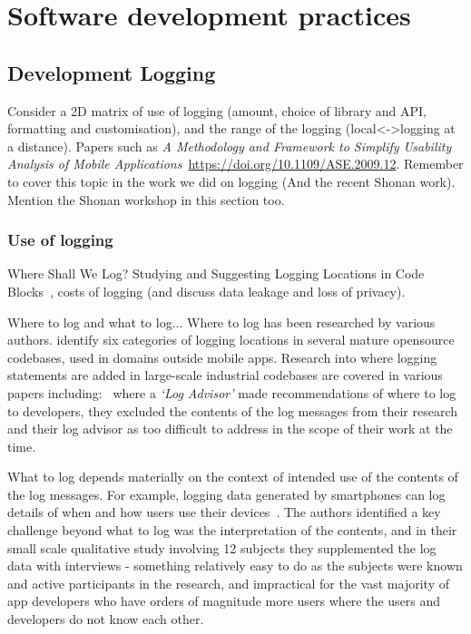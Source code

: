 \section{Software development practices}

\subsection{Development Logging}
Consider a 2D matrix of use of logging (amount, choice of library and API, formatting and customisation), and the range of the logging (local<->logging at a distance). Papers such as \emph{A Methodology and Framework to Simplify Usability Analysis of Mobile Applications}~\url{https://doi.org/10.1109/ASE.2009.12}. Remember to cover this topic in the work we did on logging (And the recent Shonan work). Mention the Shonan workshop in this section too.

\subsubsection{Use of logging}

Where Shall We Log? Studying and Suggesting Logging Locations in Code Blocks~, costs of logging (and discuss data leakage and loss of privacy).


Where to log and what to log... Where to log has been researched by various authors. \cite{li2020_where_shall_we_log} identify six categories of logging locations in several mature opensource codebases, used in domains outside mobile apps. Research into where logging statements are added in large-scale industrial codebases are covered in various papers including:~\cite{zhu2015_learning_to_log} where a \emph{`Log Advisor'} made recommendations of where to log to developers, they excluded the contents of the log messages from their research and their log advisor as too difficult to address in the scope of their work at the time.

What to log depends materially on the context of intended use of the contents of the log messages. For example, logging data generated by smartphones can log details of when and how users use their devices~\cite{ormen2015_smartphone_log_data_qualitative_perspective}. The authors identified a key challenge beyond what to log was the interpretation of the contents, and in their small scale qualitative study involving 12 subjects they supplemented the log data with interviews - something relatively easy to do as the subjects were known and active participants in the research, and impractical for the vast majority of app developers who have orders of magnitude more users where the users and developers do not know each other.




